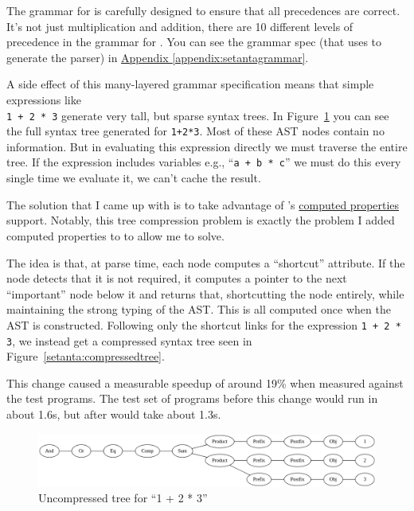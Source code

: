 The grammar for \Setanta{} is carefully designed to ensure that all precedences are correct.
It's not just multiplication and addition, there are 10 different levels of precedence in the grammar for \Setanta{}.
You can see the \Setanta{} grammar spec (that \tsPEG{} uses to generate the parser) in \hyperref[appendix:setantagrammar]{Appendix \ref*{appendix:setantagrammar}}.

A side effect of this many-layered grammar specification means that simple expressions like\\
\verb|1 + 2 * 3| generate very tall, but sparse syntax trees. In Figure~\ref{setanta:uncompressedtree} you can see the full syntax tree generated for \verb|1+2*3|.
Most of these AST nodes contain no information. But in evaluating this expression directly we must traverse the entire tree.
If the expression includes variables e.g., ``\verb|a + b * c|'' we must do this every single time we evaluate it, we can't cache the result.

The solution that I came up with is to take advantage of \tsPEG{}'s \hyperref[computed-properties]{computed properties} support. Notably, this tree compression problem is exactly the problem I added computed properties to \tsPEG{} to allow me to solve.

The idea is that, at parse time, each node computes a ``shortcut'' attribute. If the node detects that it is not required, it computes a pointer to the next ``important'' node below it and returns that, shortcutting the node entirely, while maintaining the strong typing of the AST. This is all computed once when the AST is constructed. Following only the shortcut links for the expression \verb|1 + 2 * 3|, we instead get a compressed syntax tree seen in Figure~\ref{setanta:compressedtree}.

This change caused a measurable speedup of around 19\% when measured against the test programs. The test set of programs before this change would run in about 1.6s, but after would take about 1.3s.

\begin{figure}
    \caption{Uncompressed tree for ``1 + 2 * 3''}
    \label{setanta:uncompressedtree}
    \begin{center}
    \includegraphics[scale=0.3]{app2assets/tallgraph}
    \end{center}
\end{figure}

